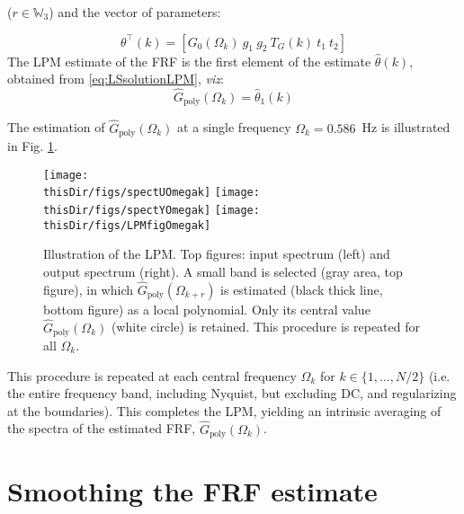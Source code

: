 \noindent
($r\in\mathbb{W}_3$)
and the vector of parameters:

\begin{equation}\label{lpmThetaEst}
\theta^\top(k)=\left[G_0(\Omega_k) \ g_1 \ g_2\  T_G(k)\  t_1 \ t_2\right]
\end{equation}
The \gls{LPM} estimate of the FRF is the first element of the estimate $\hat\theta(k)$, obtained from \eqref{eq:LSsolutionLPM}, \emph{viz}:
\begin{equation}
\hat{G}_\text{poly}(\Omega_k) = \hat\theta_1(k)
\end{equation}


The estimation of $\hat{G}_\text{poly}(\Omega_k)$ at a single frequency $\Omega_k = 0.586$~Hz is illustrated in Fig. \ref{LPM_Schematic_EG}.%
\begin{figure}[htb] %
   \centering




   \texttt{[image: \\thisDir/figs/spectUOmegak]} 
   \texttt{[image: \\thisDir/figs/spectYOmegak]} 
   \texttt{[image: \\thisDir/figs/LPMfigOmegak]} 
   \caption{Illustration of the \gls{LPM}. Top figures: input spectrum (left) and output spectrum (right). A small band is selected (gray area, top figure), in which $\hat G_\mathrm{poly}(\Omega_{k+r})$ is estimated (black thick line, bottom figure) as a local polynomial. Only its central value $\hat G_\mathrm{poly}(\Omega_k)$ (white circle) is retained. This procedure is repeated for all $\Omega_k$.}


   

   \label{LPM_Schematic_EG}
\end{figure}
This procedure is repeated at each central frequency $\Omega_k$ for  $k\in \{1,\dots,N/2\}$ (i.e. the entire frequency band, including Nyquist, but excluding DC, and regularizing at the boundaries). This completes the \gls{LPM}, yielding an intrinsic averaging of the spectra of the estimated FRF, $\hat{G}_\text{poly}(\Omega_k)$.

\section{Smoothing the \gls{FRF} estimate}\label{se:smoothingFRFestimate}



